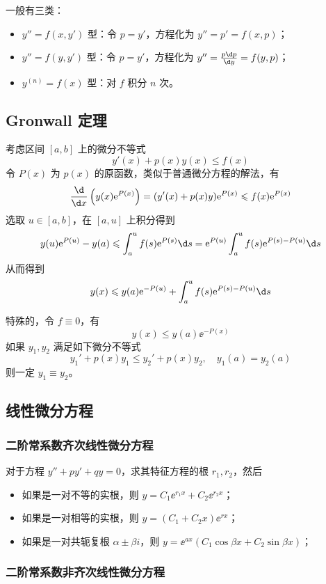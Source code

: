 一般有三类：

\begin{itemize}
	\item $y'' = f(x, y')$ 型：令 $p = y'$，方程化为 $y'' = p' = f(x, p)$；
	\item $y'' = f(y, y')$ 型：令 $p = y'$，方程化为 $y'' = \frac{p \d p}{\d y} = f(y, p)$；
	\item $y^{(n)} = f(x)$ 型：对 $f$ 积分 $n$ 次。
\end{itemize}

\subsection{Gronwall 定理}

考虑区间 $[a, b]$ 上的微分不等式
\[ y'(x) + p(x) y(x) \leqslant f(x) \]
令 $P(x)$ 为 $p(x)$ 的原函数，类似于普通微分方程的解法，有
\[ \frac{\d }{\d x} \left(y(x) \ee^{P(x)}\right) = (y'(x) + p(x) y) \ee^{P(x)} \leqslant f(x) \ee^{P(x)} \]
选取 $u \in [a, b]$，在 $[a, u]$ 上积分得到
\[ y(u) \ee^{P(u)} - y(a) \leqslant \int_{a}^{u} f(s) \ee^{P(s)} \d s = \ee^{P(u)} \int_{a}^{u} f(s) \ee^{P(s) - P(u)} \d s  \]
从而得到
\[ y(x) \leqslant y(a) \ee^{-P(u)} + \int_{a}^{u} f(s) \ee^{P(s) - P(u)} \d s \]

特殊的，令 $f \equiv 0$，有
\[ y(x) \leqslant y(a) \ee^{-P(x)} \]
如果 $y_1, y_2$ 满足如下微分不等式
\[ y_1' + p(x) y_1 \leqslant y_2' + p(x) y_2, \quad y_1(a) = y_2(a) \]
则一定 $y_1 \equiv y_2$。

\subsection{线性微分方程}

\subsubsection*{二阶常系数齐次线性微分方程}

对于方程 $y'' + py' + qy = 0$，求其特征方程的根 $r_1, r_2$，然后
\begin{itemize}
	\item 如果是一对不等的实根，则 $y = C_1 \ee^{r_1x} + C_2 \ee^{r_2 x}$；
	\item 如果是一对相等的实根，则 $y = (C_1 + C_2 x) \ee^{rx}$；
	\item 如果是一对共轭复根 $\alpha \pm \beta i$，则 $y = \ee^{ax} (C_1 \cos \beta x + C_2 \sin \beta x)$；
\end{itemize}

\subsubsection*{二阶常系数非齐次线性微分方程}

